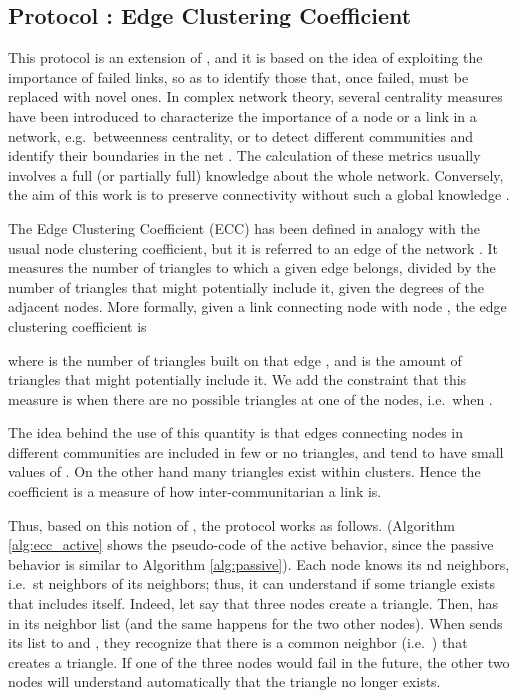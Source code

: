 \documentclass[10pt, conference, compsocconf]{IEEEtran}
\begin{document}
\subsection{Protocol : Edge Clustering Coefficient}

This protocol is an extension of , and it is based on the idea of exploiting the importance of failed links, so as to identify those that, once failed, must be replaced with novel ones. 
In complex network theory, several centrality measures have been introduced to characterize the importance of a node or a link in a network, e.g.~betweenness centrality, or to detect different communities and identify their boundaries in the net \cite{Bader:2007,girvan,Goncalves:2012,Newman200539}.
The calculation of these metrics usually involves a full (or partially full) knowledge about the whole network. 
Conversely, the aim of this work is to preserve connectivity without such a global knowledge \cite{simplex13,massoulie,VoulgarisGS05}.

The Edge Clustering Coefficient (ECC) has been defined in analogy with the usual node clustering coefficient, but it is referred to an edge of the network \cite{radicchi2004}. It measures the number of triangles
to which a given edge belongs, divided by the number of triangles that might potentially include it, given the degrees of the adjacent nodes. More formally, given a link  connecting node  with node , the edge clustering coefficient  is

where  is the number of triangles built on that edge , and  is the amount of triangles that might potentially include it. We add the constraint that this measure is  when there are no possible triangles at one of the nodes, i.e.~when .

The idea behind the use of this quantity is that edges connecting nodes in different communities are included in few or no triangles, and tend to have small values of . On the other hand many triangles exist within clusters. Hence the coefficient  is a measure of how inter-communitarian a link is.

Thus, based on this notion of , the protocol  works as follows. (Algorithm \ref{alg:ecc_active} shows the pseudo-code of the active behavior, since the passive behavior is similar to Algorithm \ref{alg:passive}).
Each node  knows its nd neighbors, i.e.~st neighbors of its neighbors; thus, it can understand if some triangle exists that includes itself. 
Indeed, let say that three nodes  create a triangle. Then,  has  in its neighbor list  (and the same happens for the two other nodes). When  sends its list  to  and , they recognize that there is a common neighbor (i.e.~) that creates a triangle.
If one of the three nodes would fail in the future, the other two nodes will understand automatically that the triangle no longer exists.
\end{document}
